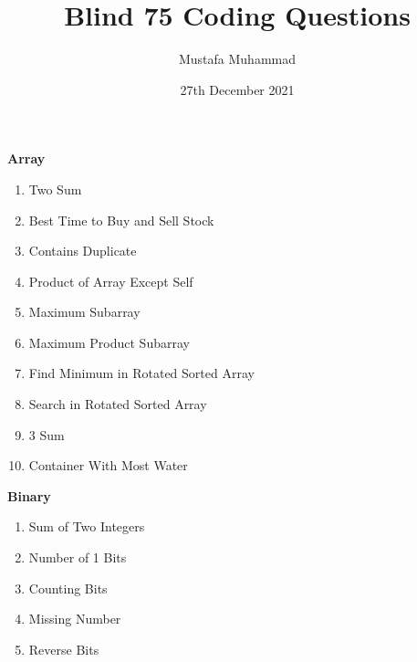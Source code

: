 \documentclass[24pt, a4]{article}
\title{Blind 75 Coding Questions}
\author{Mustafa Muhammad}
\date{27th December 2021}
\begin{document}
\maketitle

\begin{multicols}{2}
\textbf{Array}
\begin{enumerate}
	\item{Two Sum}
	\item{Best Time to Buy and Sell Stock}
	\item{Contains Duplicate}
	\item{Product of Array Except Self}
	\item{Maximum Subarray}
	\item{Maximum Product Subarray}
	\item{Find Minimum in Rotated Sorted Array}
	\item{Search in Rotated Sorted Array}
	\item{3 Sum}
	\item{Container With Most Water}
\end{enumerate}

\columnbreak
\textbf{Binary}
\begin{enumerate}
	\item{Sum of Two Integers}
	\item{Number of 1 Bits}
	\item{Counting Bits}
	\item{Missing Number}
	\item{Reverse Bits}
\end{enumerate}

\end{multicols}
\end{document}
